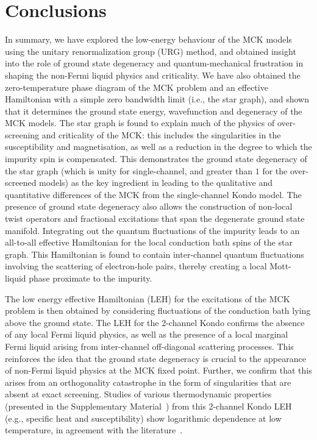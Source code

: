 \documentclass[reprint,prb,superscriptaddress]{revtex4-2}
\begin{document}
\section{Conclusions}\label{conclusions}
\par\noindent
In summary, we have explored the low-energy behaviour of the MCK models using the unitary renormalization group (URG) method, and obtained insight into the role of ground state degeneracy and quantum-mechanical frustration in shaping the non-Fermi liquid physics and criticality. We have also obtained the zero-temperature phase diagram of the MCK problem and an effective Hamiltonian with a simple zero bandwidth limit (i.e., the star graph), and shown that it determines the ground state energy, wavefunction and degeneracy of the MCK models. The star graph is found to explain much of the physics of over-screening and criticality of the MCK: this includes the singularities in the susceptibility and magnetisation, as well as a reduction in the degree to which the impurity spin is compensated. This demonstrates the ground state degeneracy of the star graph (which is unity for single-channel, and greater than $1$ for the over-screened models) as the key ingredient in leading to the qualitative and quantitative differences of the MCK from the single-channel Kondo model. The presence of ground state degeneracy also allows the construction of non-local twist operators and fractional excitations that span the degenerate ground state manifold.
Integrating out the quantum fluctuations of the impurity leads to an all-to-all effective Hamiltonian for the local conduction bath spins of the star graph. This Hamiltonian is found to contain inter-channel quantum fluctuations involving the scattering of electron-hole pairs, thereby creating a local Mott-liquid phase proximate to the impurity.
\par 
The low energy effective Hamiltonian (LEH) for the excitations of the MCK problem is then obtained by considering fluctuations of the conduction bath lying above the ground state. The LEH for the 2-channel Kondo confirms the absence of any local Fermi liquid physics, as well as the presence of a local marginal Fermi liquid arising from inter-channel off-diagonal scattering processes. This reinforces the idea that the ground state degeneracy is crucial to the appearance of non-Fermi liquid physics at the MCK fixed point. Further, we confirm that this arises from an orthogonality catastrophe in the form of singularities that are absent at exact screening. Studies of various thermodynamic properties (presented in the Supplementary Material~\cite{SM}) from this 2-channel Kondo LEH (e.g., specific heat and susceptibility) show logarithmic dependence at low temperature, in agreement with the literature~\cite{affleck_1991_overscreen,affleck_ludwig_1991,affleck_pang_cox_1992,affleck1993exact,parcollet_olivier_large_N,affleck_2005,emery_kivelson,andrei_destri_1984,Tsvelick1984,Tsvelick_1985,andrei_jerez_1995,zarand_costi_2002}.
\end{document}
